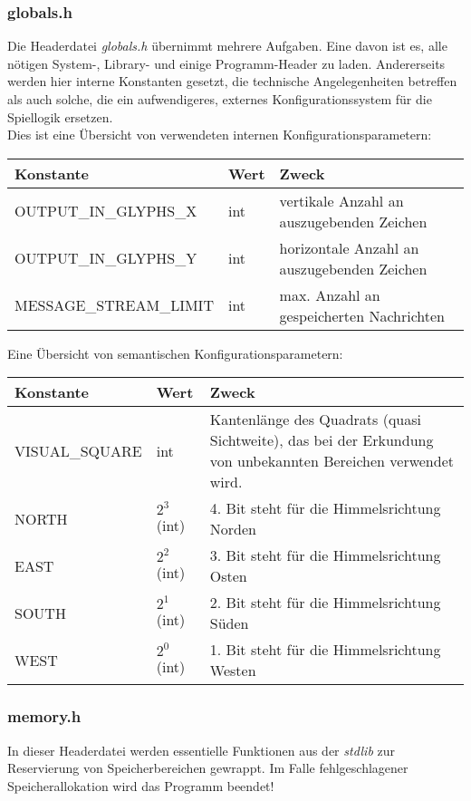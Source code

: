 \documentclass[11pt,a4paper,notitlepage]{report}
\begin{document}
			\subsubsection*{globals.h}
			Die Headerdatei \textit{globals.h} übernimmt mehrere Aufgaben. Eine davon ist es, alle nötigen \mbox{System-,} Library- und einige Programm-Header zu laden. Andererseits werden hier interne Konstanten gesetzt, die technische Angelegenheiten betreffen als auch solche, die ein aufwendigeres, externes Konfigurationssystem für die Spiellogik ersetzen. \\
	\vspace{1 cm}
	Dies ist eine Übersicht von verwendeten internen Konfigurationsparametern:\\
	\vspace{1 cm}
	\begin{tabular}{ p{5.0cm} | p{2.5cm} | p{8.0cm} }
		Konstante & Wert & Zweck \\
		\hline
		OUTPUT\_IN\_GLYPHS\_X & int & vertikale Anzahl an auszugebenden Zeichen \\
		OUTPUT\_IN\_GLYPHS\_Y & int & horizontale Anzahl an auszugebenden Zeichen \\
		MESSAGE\_STREAM\_LIMIT & int & max. Anzahl an gespeicherten Nachrichten
	\end{tabular}
	\vspace{1 cm}
	Eine Übersicht von semantischen Konfigurationsparametern:\\
	\vspace{1 cm}
		\begin{tabular}{ p{5.0cm} | p{2.5cm} | p{8.0cm} }
		Konstante & Wert & Zweck \\
		\hline
		VISUAL\_SQUARE & int & Kantenlänge des Quadrats (quasi Sichtweite), das bei der Erkundung von unbekannten Bereichen verwendet wird. \\
		NORTH & $2^3$ (int) & 4. Bit steht für die Himmelsrichtung Norden \\
		EAST & $2^2$ (int) & 3. Bit steht für die Himmelsrichtung Osten \\
		SOUTH & $2^1$ (int) & 2. Bit steht für die Himmelsrichtung Süden \\
		WEST & $2^0$ (int) & 1. Bit steht für die Himmelsrichtung Westen
	\end{tabular}
	\newpage
	\subsubsection*{memory.h}
	In dieser Headerdatei werden essentielle Funktionen aus der \textit{stdlib} zur Reservierung von Speicherbereichen gewrappt. Im Falle fehlgeschlagener Speicherallokation wird das Programm beendet!
	
\end{document}
